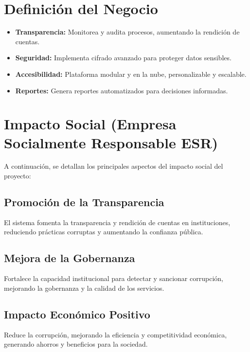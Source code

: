 \documentclass[a4paper,12pt]{article}
\begin{document}
\section{Definición del Negocio}

\begin{itemize}
    \item \textbf{Transparencia:} Monitorea y audita procesos, aumentando la rendición de cuentas.
    \item \textbf{Seguridad:} Implementa cifrado avanzado para proteger datos sensibles.
    \item \textbf{Accesibilidad:} Plataforma modular y en la nube, personalizable y escalable.
    \item \textbf{Reportes:} Genera reportes automatizados para decisiones informadas.
\end{itemize}


\section{Impacto Social (Empresa Socialmente Responsable ESR)}
A continuación, se detallan los principales aspectos del impacto social del proyecto:

\subsection{Promoción de la Transparencia}
El sistema fomenta la transparencia y rendición de cuentas en instituciones, reduciendo prácticas corruptas y aumentando la confianza pública.

\subsection{Mejora de la Gobernanza}
Fortalece la capacidad institucional para detectar y sancionar corrupción, mejorando la gobernanza y la calidad de los servicios.

\subsection{Impacto Económico Positivo}
Reduce la corrupción, mejorando la eficiencia y competitividad económica, generando ahorros y beneficios para la sociedad.
\end{document}
